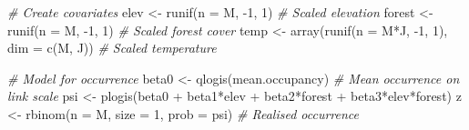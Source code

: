 \documentclass[
]{book}
\newenvironment{Shaded}{\begin{snugshade}}{\end{snugshade}}
\newcommand{\AttributeTok}[1]{\textcolor[rgb]{0.77,0.63,0.00}{#1}}
\newcommand{\CommentTok}[1]{\textcolor[rgb]{0.56,0.35,0.01}{\textit{#1}}}
\newcommand{\DecValTok}[1]{\textcolor[rgb]{0.00,0.00,0.81}{#1}}
\newcommand{\FunctionTok}[1]{\textcolor[rgb]{0.00,0.00,0.00}{#1}}
\newcommand{\NormalTok}[1]{#1}
\newcommand{\OtherTok}[1]{\textcolor[rgb]{0.56,0.35,0.01}{#1}}
\newcommand{\SpecialCharTok}[1]{\textcolor[rgb]{0.00,0.00,0.00}{#1}}
\begin{document}
\begin{Shaded}
\begin{Highlighting}[]
\CommentTok{\# Create covariates}
\NormalTok{elev }\OtherTok{\textless{}{-}} \FunctionTok{runif}\NormalTok{(}\AttributeTok{n =}\NormalTok{ M, }\SpecialCharTok{{-}}\DecValTok{1}\NormalTok{, }\DecValTok{1}\NormalTok{)                         }\CommentTok{\# Scaled elevation}
\NormalTok{forest }\OtherTok{\textless{}{-}} \FunctionTok{runif}\NormalTok{(}\AttributeTok{n =}\NormalTok{ M, }\SpecialCharTok{{-}}\DecValTok{1}\NormalTok{, }\DecValTok{1}\NormalTok{)                       }\CommentTok{\# Scaled forest cover}
\NormalTok{temp }\OtherTok{\textless{}{-}} \FunctionTok{array}\NormalTok{(}\FunctionTok{runif}\NormalTok{(}\AttributeTok{n =}\NormalTok{ M}\SpecialCharTok{*}\NormalTok{J, }\SpecialCharTok{{-}}\DecValTok{1}\NormalTok{, }\DecValTok{1}\NormalTok{), }\AttributeTok{dim =} \FunctionTok{c}\NormalTok{(M, J)) }\CommentTok{\# Scaled temperature}

\CommentTok{\# Model for occurrence}
\NormalTok{beta0 }\OtherTok{\textless{}{-}} \FunctionTok{qlogis}\NormalTok{(mean.occupancy)               }\CommentTok{\# Mean occurrence on link scale}
\NormalTok{psi }\OtherTok{\textless{}{-}} \FunctionTok{plogis}\NormalTok{(beta0 }\SpecialCharTok{+}\NormalTok{ beta1}\SpecialCharTok{*}\NormalTok{elev }\SpecialCharTok{+}\NormalTok{ beta2}\SpecialCharTok{*}\NormalTok{forest }\SpecialCharTok{+}\NormalTok{ beta3}\SpecialCharTok{*}\NormalTok{elev}\SpecialCharTok{*}\NormalTok{forest)}
\NormalTok{z }\OtherTok{\textless{}{-}} \FunctionTok{rbinom}\NormalTok{(}\AttributeTok{n =}\NormalTok{ M, }\AttributeTok{size =} \DecValTok{1}\NormalTok{, }\AttributeTok{prob =}\NormalTok{ psi)      }\CommentTok{\# Realised occurrence}


\end{Highlighting}
\end{Shaded}
\end{document}
